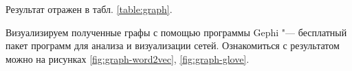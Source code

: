 \documentclass[coursework]{SCWorks}
\begin{document}
Результат отражен в табл. \ref{table:graph}.

Визуализируем полученные графы с помощью программы Gephi "--- бесплатный пакет программ для анализа и визуализации сетей. Ознакомиться с результатом можно на рисунках \ref{fig:graph-word2vec}, \ref{fig:graph-glove}.


\conclusion


% 
% 

\appendix
\end{document}

